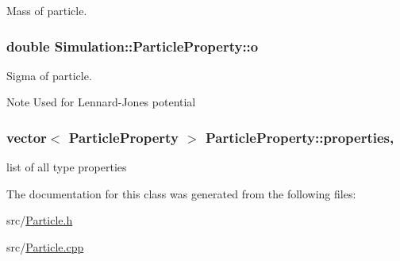 Mass of particle. 

\hypertarget{classSimulation_1_1ParticleProperty_a53851810b9a7de47591967ce60b69367}{
\subsubsection[{o}]{\setlength{\rightskip}{0pt plus 5cm}double Simulation\-::\-Particle\-Property\-::o}}\label{classSimulation_1_1ParticleProperty_a53851810b9a7de47591967ce60b69367}


Sigma of particle. 

\begin{DoxyNote}{Note}
Used for Lennard-\/\-Jones potential 
\end{DoxyNote}
\hypertarget{classSimulation_1_1ParticleProperty_a347c0996e25e4d4fa48ca1ce3db7e7f7}{
\subsubsection[{properties}]{\setlength{\rightskip}{0pt plus 5cm}vector$<$ {\bf Particle\-Property} $>$ Particle\-Property\-::properties\hspace{0.3cm}{\ttfamily [static]}, {\ttfamily [private]}}}\label{classSimulation_1_1ParticleProperty_a347c0996e25e4d4fa48ca1ce3db7e7f7}


list of all type properties 



The documentation for this class was generated from the following files\-:\begin{DoxyCompactItemize}
\item 
src/\hyperlink{Particle_8h}{Particle.\-h}\item 
src/\hyperlink{Particle_8cpp}{Particle.\-cpp}\end{DoxyCompactItemize}
